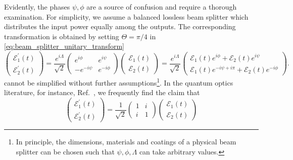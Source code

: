 Evidently, the phases $\psi,\phi$ are a source of confusion and require a thorough examination.
For simplicity, we assume a balanced lossless beam splitter which distributes the input power equally among the outputs.
The corresponding transformation is obtained by setting $\Theta=\pi/4$ in \cref{eq:beam_splitter_unitary_transform}
\begin{equation}
    \begin{pmatrix}
        \mathcal{E}_1^\prime(t)
        \\
        \mathcal{E}_2^\prime(t)
    \end{pmatrix}
    =
    \frac{e^{i\Lambda}}{\sqrt{2}}
    \begin{pmatrix}
        e^{i\phi} & e^{i\psi}
        \\
        -e^{-i\psi} & e^{-i\phi}
    \end{pmatrix}
    \begin{pmatrix}
        \mathcal{E}_1(t)
        \\
        \mathcal{E}_2(t)
    \end{pmatrix}
    =
    \frac{e^{i\Lambda}}{\sqrt{2}}
    \begin{pmatrix}
        \mathcal{E}_1(t)e^{i\phi}+\mathcal{E}_2(t)e^{i\psi}
        \\
        \mathcal{E}_1(t)e^{-i\psi+i\pi}+\mathcal{E}_2(t)e^{-i\phi}
    \end{pmatrix}
    \label{eq:beam_splitter_unitary_transform_balanced}.
\end{equation}
 cannot be simplified without further assumptions\footnote{In principle, the dimensions, materials and coatings of a physical beam splitter can be chosen such that $\psi,\phi,\Lambda$ can take arbitrary values.}.
In the quantum optics literature, for instance, Ref.~\cite[p.~138]{Gerry2005}, we frequently find the claim that
\begin{equation}
    \begin{pmatrix}
        \mathcal{E}_1^\prime(t)
        \\
        \mathcal{E}_2^\prime(t)
    \end{pmatrix}
    =
    \frac{1}{\sqrt{2}}
    \begin{pmatrix}
        1 & i\\
        i & 1
    \end{pmatrix}
    \begin{pmatrix}
        \mathcal{E}_1(t)
        \\
        \mathcal{E}_2(t)
    \end{pmatrix}
    \label{eq:beam_splitter_unitary_transform_balanced_qo}
\end{equation}
